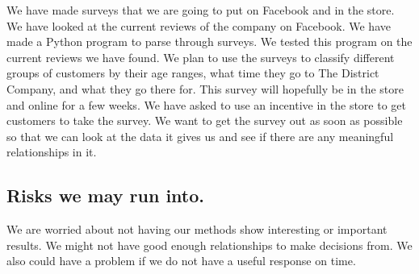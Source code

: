 \documentclass[11pt]{report}
\begin{document}
\newline
We have made surveys that we are going to put on Facebook and in the store. We have looked at the current reviews of the company on Facebook. We have made a Python program to parse through surveys. We tested this program on the current reviews we have found. We plan to use the surveys to classify different groups of customers by their age ranges, what time they go to The District Company, and what they go there for.  
\newline
This survey will hopefully be in the store and online for a few weeks.  We have asked to use an incentive in the store to get customers to take the survey.  We want to get the survey out as soon as possible so that we can look at the data it gives us and see if there are any meaningful relationships in it.   


\subsection*{\hspace{-.5cm} Risks we may run into.}\label{tech}
We are worried about not having our methods show interesting or important results.  We might not have good enough relationships to make decisions from.  We also could have a problem if we do not have a useful response on time.  
\end{document}
